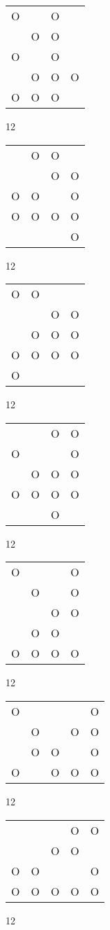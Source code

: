 \begin{tabular}{|m{0.2cm}m{0.2cm}m{0.2cm}m{0.2cm}|}\hline
O& &O& \\
 &O&O& \\
O& &O& \\
 &O&O&O\\
O&O&O& \\
\hline\end{tabular}12
\begin{tabular}{|m{0.2cm}m{0.2cm}m{0.2cm}m{0.2cm}|}\hline
 &O&O& \\
 & &O&O\\
O&O& &O\\
O&O&O&O\\
 & & &O\\
\hline\end{tabular}12
\begin{tabular}{|m{0.2cm}m{0.2cm}m{0.2cm}m{0.2cm}|}\hline
O&O& & \\
 & &O&O\\
 &O&O&O\\
O&O&O&O\\
O& & & \\
\hline\end{tabular}12
\begin{tabular}{|m{0.2cm}m{0.2cm}m{0.2cm}m{0.2cm}|}\hline
 & &O&O\\
O& & &O\\
 &O&O&O\\
O&O&O&O\\
 & &O& \\
\hline\end{tabular}12
\begin{tabular}{|m{0.2cm}m{0.2cm}m{0.2cm}m{0.2cm}|}\hline
O& & &O\\
 &O& &O\\
 & &O&O\\
 &O&O& \\
O&O&O&O\\
\hline\end{tabular}12
\begin{tabular}{|m{0.2cm}m{0.2cm}m{0.2cm}m{0.2cm}m{0.2cm}|}\hline
O& & & &O\\
 &O& &O&O\\
 &O&O& &O\\
O& &O&O&O\\
\hline\end{tabular}12
\begin{tabular}{|m{0.2cm}m{0.2cm}m{0.2cm}m{0.2cm}m{0.2cm}|}\hline
 & & &O&O\\
 & &O&O& \\
O&O& & &O\\
O&O&O&O&O\\
\hline\end{tabular}12
